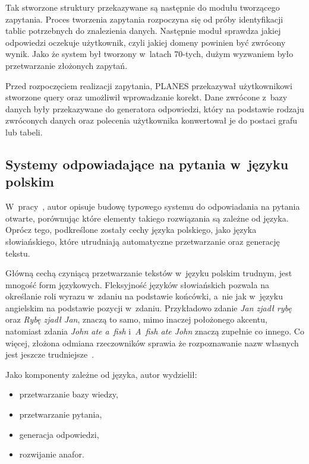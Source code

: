 Tak stworzone struktury przekazywane są następnie do modułu tworzącego zapytania. Proces tworzenia zapytania rozpoczyna się od próby identyfikacji tablic potrzebnych do znalezienia danych. Następnie moduł sprawdza jakiej odpowiedzi oczekuje użytkownik, czyli jakiej domeny powinien być zwrócony wynik. Jako że system był tworzony w~latach 70-tych, dużym wyzwaniem było przetwarzanie złożonych zapytań.

Przed rozpoczęciem realizacji zapytania, PLANES przekazywał użytkownikowi stworzone query oraz umożliwił wprowadzanie korekt. Dane zwrócone z~bazy danych były przekazywane do generatora odpowiedzi, który na podstawie rodzaju zwróconych danych oraz polecenia użytkownika konwertował je do postaci grafu lub tabeli\cite{waltz1978english}.

\subsection{Systemy odpowiadające na pytania w~języku polskim}\label{subsec:lit:pl}


W~pracy~\cite{przybyla2012issues}, autor opisuje budowę typowego systemu do odpowiadania na pytania otwarte, porównując które elementy takiego rozwiązania są zależne od języka. Oprócz tego, podkreślone zostały cechy języka polskiego, jako języka słowiańskiego, które utrudniają automatyczne przetwarzanie oraz generację tekstu.

Główną cechą czyniącą przetwarzanie tekstów w~języku polskim trudnym, jest mnogość form językowych. Fleksyjność języków słowiańskich pozwala na określanie roli wyrazu w~zdaniu na podstawie końcówki, a~nie jak w~języku angielskim na podstawie pozycji w~zdaniu. Przykładowo zdanie \emph{Jan zjadł rybę} oraz \emph{Rybę zjadł Jan}, znaczą to samo, mimo inaczej położonego akcentu, natomiast zdania \emph{John ate a~fish} i~\emph{A~fish ate John} znaczą zupełnie co innego. Co więcej, złożona odmiana rzeczowników sprawia że rozpoznawanie nazw własnych jest jeszcze trudniejsze~\cite{przybyla2012issues}.

Jako komponenty zależne od języka, autor wydzielił:
\begin{itemize}
	\item przetwarzanie bazy wiedzy,
	\item przetwarzanie pytania,
	\item generacja odpowiedzi,
	\item rozwijanie anafor.
\end{itemize}

